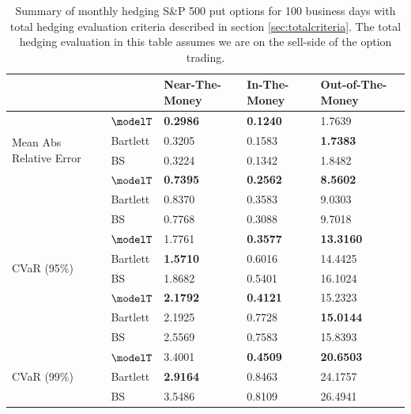 \begin{table}[htp!]
	\centering
	\begin{tabular}{ll|l|l|l|}
		\cline{3-5}
		&          & Near-The-Money   & In-The-Money     & Out-of-The-Money  \\ \hline
		\multicolumn{1}{|l|}{\multirow{4}{*}{Mean Abs Relative Error}} & $\modelT$    & \textbf{0.2986}  & \textbf{0.1240}  & 1.7639            \\  
		\multicolumn{1}{|l|}{}                                & Bartlett & 0.3205           & 0.1583           & \textbf{1.7383}            \\  
		\multicolumn{1}{|l|}{}                                & BS       & 0.3224           & 0.1342           & 1.8482            \\ \hline
		\multicolumn{1}{|l|}{\multirow{4}{*}{VaR (95\%)}}     & $\modelT$    & \textbf{0.7395} & \textbf{0.2562} & \textbf{8.5602}           \\  
		\multicolumn{1}{|l|}{}                                & Bartlett & 0.8370          & 0.3583          & 9.0303           \\  
		\multicolumn{1}{|l|}{}                                & BS       & 0.7768          & 0.3088          & 9.7018           \\ \hline
		\multicolumn{1}{|l|}{\multirow{4}{*}{CVaR (95\%)}}    & $\modelT$    & 1.7761          & \textbf{0.3577} & \textbf{13.3160} \\  
		\multicolumn{1}{|l|}{}                                & Bartlett & \textbf{1.5710} & 0.6016          & 14.4425          \\  
		\multicolumn{1}{|l|}{}                                & BS       & 1.8682          & 0.5401          & 16.1024          \\ \hline
		\multicolumn{1}{|l|}{\multirow{4}{*}{VaR (99\%)}}     & $\modelT$    & \textbf{2.1792}          & \textbf{0.4121} & 15.2323          \\  
		\multicolumn{1}{|l|}{}                                & Bartlett & 2.1925         & 0.7728          & \textbf{15.0144} \\  
		\multicolumn{1}{|l|}{}                                & BS       & 2.5569          & 0.7583          & 15.8393          \\ \hline
		\multicolumn{1}{|l|}{\multirow{4}{*}{CVaR (99\%)}}    & $\modelT$    & 3.4001          & \textbf{0.4509}  & \textbf{20.6503} \\  
		\multicolumn{1}{|l|}{}                                & Bartlett & \textbf{2.9164} & 0.8463          & 24.1757          \\  
		\multicolumn{1}{|l|}{}                                & BS       & 3.5486          & 0.8109          & 26.4941          \\ \hline
	\end{tabular}
	\caption{Summary of monthly hedging S\&P 500 put options for 100 business days with total hedging evaluation criteria described in section \ref{sec:totalcriteria}. The total hedging evaluation in this table assumes we are on the sell-side of the option trading.}
	\label{table:putTotalM}
\end{table}
